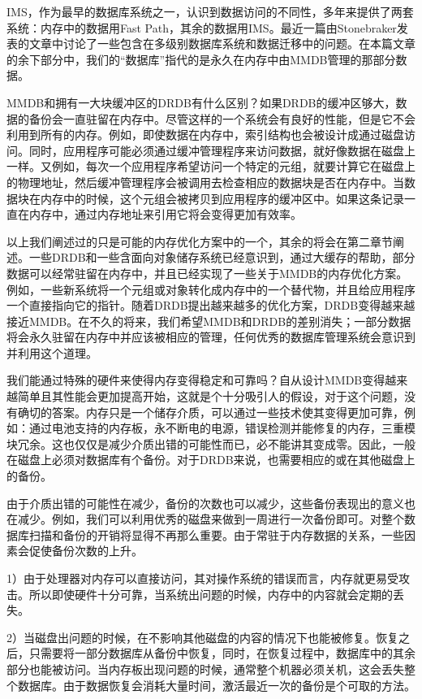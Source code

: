 \documentclass[translation]{zjutreport}
\begin{document}
IMS，作为最早的数据库系统之一，认识到数据访问的不同性，多年来提供了两套系统：内存中的数据用Fast Path，其余的数据用IMS。最近一篇由Stonebraker发表的文章中讨论了一些包含在多级别数据库系统和数据迁移中的问题。在本篇文章的余下部分中，我们的“数据库”指代的是永久在内存中由MMDB管理的那部分数据。

MMDB和拥有一大块缓冲区的DRDB有什么区别？如果DRDB的缓冲区够大，数据的备份会一直驻留在内存中。尽管这样的一个系统会有良好的性能，但是它不会利用到所有的内存。例如，即使数据在内存中，索引结构也会被设计成通过磁盘访问。同时，应用程序可能必须通过缓冲管理程序来访问数据，就好像数据在磁盘上一样。又例如，每次一个应用程序希望访问一个特定的元组，就要计算它在磁盘上的物理地址，然后缓冲管理程序会被调用去检查相应的数据块是否在内存中。当数据块在内存中的时候，这个元组会被拷贝到应用程序的缓冲区中。如果这条记录一直在内存中，通过内存地址来引用它将会变得更加有效率。

以上我们阐述过的只是可能的内存优化方案中的一个，其余的将会在第二章节阐述。一些DRDB和一些含面向对象储存系统已经意识到，通过大缓存的帮助，部分数据可以经常驻留在内存中，并且已经实现了一些关于MMDB的内存优化方案。例如，一些新系统将一个元组或对象转化成内存中的一个替代物，并且给应用程序一个直接指向它的指针。随着DRDB提出越来越多的优化方案，DRDB变得越来越接近MMDB。在不久的将来，我们希望MMDB和DRDB的差别消失；一部分数据将会永久驻留在内存中并应该被相应的管理，任何优秀的数据库管理系统会意识到并利用这个道理。

我们能通过特殊的硬件来使得内存变得稳定和可靠吗？自从设计MMDB变得越来越简单且其性能会更加提高开始，这就是个十分吸引人的假设，对于这个问题，没有确切的答案。内存只是一个储存介质，可以通过一些技术使其变得更加可靠，例如：通过电池支持的内存板，永不断电的电源，错误检测并能修复的内存，三重模块冗余。这也仅仅是减少介质出错的可能性而已，必不能讲其变成零。因此，一般在磁盘上必须对数据库有个备份。对于DRDB来说，也需要相应的或在其他磁盘上的备份。

由于介质出错的可能性在减少，备份的次数也可以减少，这些备份表现出的意义也在减少。例如，我们可以利用优秀的磁盘来做到一周进行一次备份即可。对整个数据库扫描和备份的开销将显得不再那么重要。由于常驻于内存数据的关系，一些因素会促使备份次数的上升。

1）由于处理器对内存可以直接访问，其对操作系统的错误而言，内存就更易受攻击。所以即使硬件十分可靠，当系统出问题的时候，内存中的内容就会定期的丢失。

2）当磁盘出问题的时候，在不影响其他磁盘的内容的情况下也能被修复。恢复之后，只需要将一部分数据库从备份中恢复，同时，在恢复过程中，数据库中的其余部分也能被访问。当内存板出现问题的时候，通常整个机器必须关机，这会丢失整个数据库。由于数据恢复会消耗大量时间，激活最近一次的备份是个可取的方法。
\end{document}

